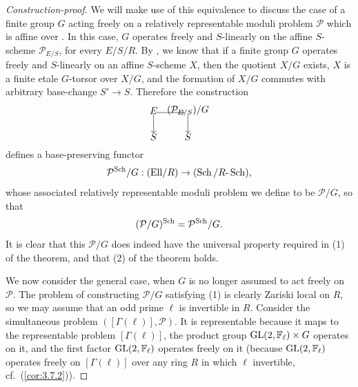 \begin{proof}[Construction-proof]
We will make use of this equivalence to discuss the case of a finite group $G$ acting freely on a relatively representable moduli problem $\mathcal{P}$ which is affine over \EllR. In this case, $G$ operates freely and $S$-linearly on the affine $S$-scheme $\mathcal{P}_{E/S}$, for every $E/S/R$. By \cite[III, \S2,6.1]{DeGa}, we know that if a finite group $G$ operates freely and $S$-linearly on an affine $S$-scheme $X$, then the quotient $X/G$ exists, $X$ is a finite etale $G$-torsor over $X/G$, and the formation of $X/G$ commutes with arbitrary base-change $S' \to S$. Therefore the construction
\[
\kmfobj{E}{(\mathcal{P}_{E/S})/G}{S}
\]
defines a base-preserving functor
\[
\mathcal{P}^{\operatorname{Sch}}/G : (\mathrm{Ell}/R) \to (\operatorname{Sch}/R\text{-}\operatorname{Sch}) ,
\]
whose associated relatively representable moduli problem we define to be $\mathcal{P}/G$, so that
\[
(\mathcal{P}/G)^{\operatorname{Sch}} = \mathcal{P}^{\operatorname{Sch}}/G .
\]
It is clear that this $\mathcal{P}/G$ does indeed have the universal property required in (1) of the theorem, and that (2) of the theorem holds.

We now consider the general case, when $G$ is no longer assumed to act freely on $\mathcal{P}$. The problem of constructing $\mathcal{P}/G$ satisfying (1) is clearly Zariski local on $R$, so we may assume that an odd prime $\ell$ is invertible in $R$. Consider the simultaneous problem $([\Gamma(\ell)], \mathcal{P})$. It is representable because it maps to the representable problem $[\Gamma(\ell)]$, the product group $\operatorname{GL}(2,\mathbb{F}_\ell) \times G$ operates on it, and the first factor $\operatorname{GL}(2,\mathbb{F}_\ell)$ operates freely on it (because $\operatorname{GL}(2,\mathbb{F}_\ell)$ operates freely on $[\Gamma(\ell)]$ over any ring $R$ in which $\ell$ invertible, cf.\ (\ref{cor:3.7.2})).


\end{proof}

